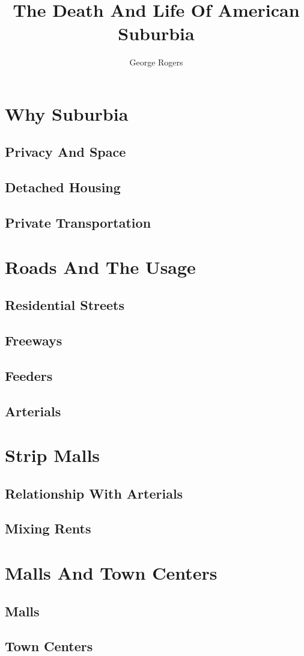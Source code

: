 \documentclass[openany]{amsbook}
\title{The Death And Life Of American Suburbia}
\author{George Rogers}
\begin{document}
\dominitoc
\maketitle

\tableofcontents
\chapter{Why Suburbia}
\minitoc
\lorem
\section{Privacy And Space}
\lorem
\section{Detached Housing}
\lorem
\section{Private Transportation}
\lorem
\chapter{Roads And The Usage}
\minitoc
\lorem
\section{Residential Streets}
\lorem
\section{Freeways}
\lorem
\section{Feeders}
\lorem
\section{Arterials}
\lorem
\chapter{Strip Malls}
\minitoc
\lorem
\section{Relationship With Arterials}
\lorem
\section{Mixing Rents}
\lorem
\chapter{Malls And Town Centers}
\minitoc
\lorem
\section{Malls}
\lorem
\section{Town Centers}
\lorem
\listoffigures
\end{document}
